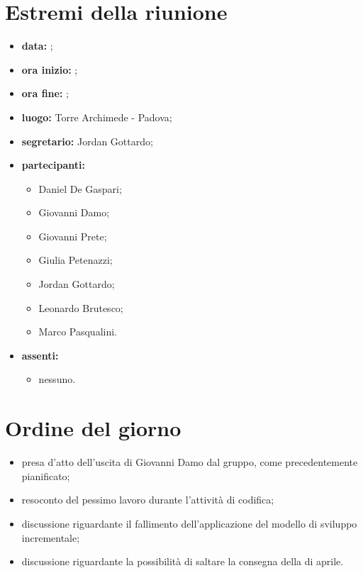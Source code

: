 \documentclass[a4paper,11pt]{article}
\begin{document}
	\section{Estremi della riunione}
	\begin{itemize}
		\item \textbf{data:} ;
		\item \textbf{ora inizio:} ;
		\item \textbf{ora fine:} ;
		\item \textbf{luogo:} Torre Archimede - Padova;
		\item \textbf{segretario:} Jordan Gottardo;
		\item \textbf{partecipanti:}
			\begin{itemize}
				\item Daniel De Gaspari;
				\item Giovanni Damo;
				\item Giovanni Prete;
				\item Giulia Petenazzi;
				\item Jordan Gottardo;
				\item Leonardo Brutesco;
				\item Marco Pasqualini.
			\end{itemize}
		\item \textbf{assenti:}
			\begin{itemize}
				\item nessuno.
			\end{itemize}
	\end{itemize}
	\section{Ordine del giorno}
		\begin{itemize}
			\item presa d'atto dell'uscita di Giovanni Damo dal gruppo, come precedentemente pianificato;
			\item resoconto del pessimo lavoro durante l'attività di codifica;
			\item discussione riguardante il fallimento dell'applicazione del modello di sviluppo incrementale;
			\item discussione riguardante la possibilità di saltare la consegna della \revaqual{} di aprile.
		\end{itemize}
\end{document}
